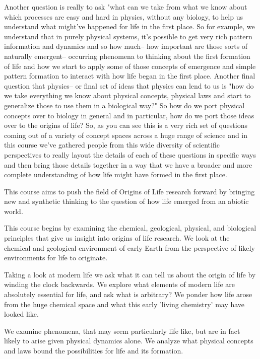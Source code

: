 \documentclass[]{article}
\begin{document}
Another question is really to ask "what
can we take from what we know about which
processes are easy and hard in physics,
without any biology, to help us understand
what might've happened for life in the 
first place.
So for example, we understand that in
purely physical systems, it's possible to
get very rich pattern information and
dynamics and so how much-- how important
are those sorts of naturally emergent--
occurring phenomena to thinking about the
first formation of life and how we start
to apply some of those concepts of
emergence and simple pattern formation to
interact with
how life began in the first place.
Another final question that physics-- or
final set of ideas that physics can lend
to us is "how do we take everything we
know about physical concepts, physical
laws and start to generalize those to use
them in a biological way?"
So how do we port physical concepts over
to biology in general and in particular,
how do we port those ideas over to the
origins of life?
So, as you can see this is a very rich
set of questions coming out of a variety
of concept spaces across a huge range of
science and in this course we've gathered
people from this wide diversity of
scientific perspectives to really layout
the details of each of these questions in
specific ways and then bring those details
together in a way that we have a broader
and more complete understanding of how
life might have formed in the first place.




    This course aims to push the field of Origins of Life research forward by bringing new and synthetic thinking to the question of how life emerged from an abiotic world.

This course begins by examining the chemical, geological, physical, and biological principles that give us insight into origins of life research. We look at the chemical and geological environment of early Earth from the perspective of likely environments for life to originate.

Taking a look at modern life we ask what it can tell us about the origin of life by winding the clock backwards. We explore what elements of modern life are absolutely essential for life, and ask what is arbitrary? We ponder how life arose from the huge chemical space and what this early 'living chemistry' may have looked like.

We examine phenomena, that may seem particularly life like, but are in fact likely to arise given physical dynamics alone. We analyze what physical concepts and laws bound the possibilities for life and its formation.
\end{document}
